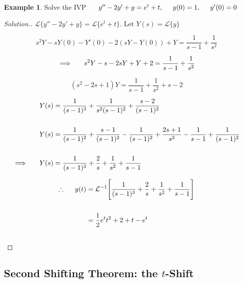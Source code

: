 \documentclass[11pt,a4paper]{article}
\theoremstyle{definition}
\newtheorem{exa}[thm]{Example}
\newenvironment{solution}
  {\renewcommand{\qedsymbol}{}\begin{proof}[\textit{Solution}.]}
  {\end{proof}}
\begin{document}
\begin{exa}


Solve the IVP $\hspace{0.5cm} y'' - 2y' + y = e^t + t,\hspace{0.5cm} y(0) = 1,\hspace{0.5cm} y'(0) = 0$
\end{exa}


\begin{solution}


$\displaystyle{\mathcal{L}\{y'' - 2y' + y\}= \mathcal{L}\{e^t + t\}}$. Let $Y(s) = \mathcal{L}\{y\}$

$$s^2Y -sY(0) - Y'(0) - 2(sY- Y(0)) + Y = \frac{1}{s -1} + \frac{1}{s^2} $$

$$\implies\hspace{0.5cm} s^2Y - s -2s Y + Y + 2 = \frac{1}{s - 1} + \frac{1}{s^2}$$

$$(s^2 -2s + 1)Y = \frac{1}{s - 1} + \frac{1}{s^2} + s-2$$

\begin{align*}
Y(s) & = \frac{1}{(s -1)^3} + \frac{1}{s^2 (s-1)^2} + \frac{s-2}{(s-1)^2}\\\\
Y(s) & = \frac{1}{(s -1)^2} + \frac{s - 1}{(s -1)^2} - \frac{1}{(s - 1)^2} + \frac{2s + 1}{s^2} - \frac{1}{s-1} + \frac{1}{(s - 1)^2}\\\\
\implies \hspace{0.5cm} Y(s) & = \frac{1}{(s - 1)^3} + \frac{2}{s} + \frac{1}{s^2} + \frac{1}{s-1}
\end{align*}

\begin{align*}
\therefore\hspace{0.5cm} y(t) & = \mathcal{L}^{-1}\Bigg[\frac{1}{(s - 1)^3} + \frac{2}{s} + \frac{1}{s^2} + \frac{1}{s - 1}\Bigg]\\\\
& = \frac{1}{2}e^tt^2 + 2 + t - e^t\\\
\end{align*}

\pagebreak
\end{solution}
{\color[wave]{485}\subsection{Second Shifting Theorem: the $t$-Shift}}
\end{document}
